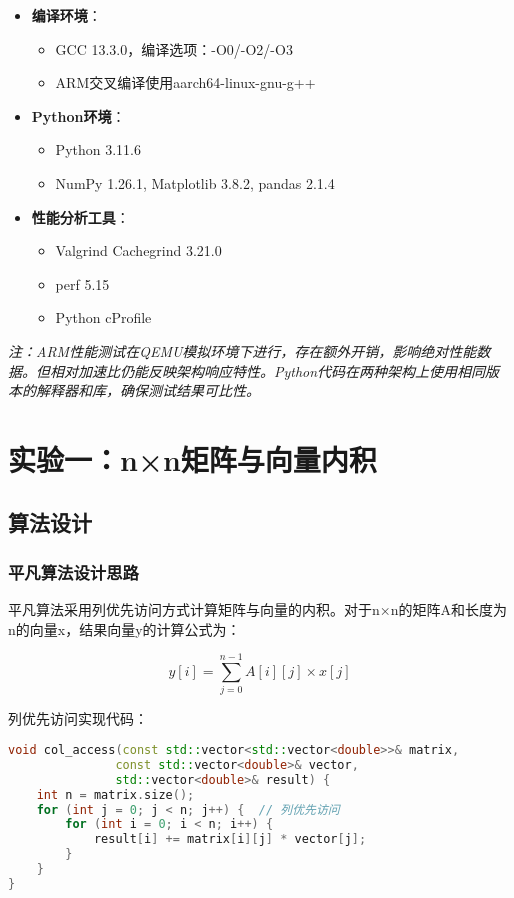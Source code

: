 \documentclass[a4paper,colorlinks=true,linkcolor=blue,urlcolor=blue,citecolor=green,bookmarks=true]{article}
\begin{document}
\begin{itemize}
  \item \textbf{编译环境}：
    \begin{itemize}
      \item GCC 13.3.0，编译选项：-O0/-O2/-O3
      \item ARM交叉编译使用aarch64-linux-gnu-g++
    \end{itemize}
  \item \textbf{Python环境}：
    \begin{itemize}
      \item Python 3.11.6
      \item NumPy 1.26.1, Matplotlib 3.8.2, pandas 2.1.4
    \end{itemize}
  \item \textbf{性能分析工具}：
    \begin{itemize}
      \item Valgrind Cachegrind 3.21.0
      \item perf 5.15
      \item Python cProfile
    \end{itemize}
\end{itemize}

\textit{注：ARM性能测试在QEMU模拟环境下进行，存在额外开销，影响绝对性能数据。但相对加速比仍能反映架构响应特性。Python代码在两种架构上使用相同版本的解释器和库，确保测试结果可比性。}

\section{实验一：n×n矩阵与向量内积}

\subsection{算法设计}

\subsubsection{平凡算法设计思路}

平凡算法采用列优先访问方式计算矩阵与向量的内积。对于n×n的矩阵A和长度为n的向量x，结果向量y的计算公式为：

\begin{equation}
  y[i] = \sum_{j=0}^{n-1} A[i][j] \times x[j]
\end{equation}

列优先访问实现代码：

\begin{lstlisting}[language=C++]
void col_access(const std::vector<std::vector<double>>& matrix, 
               const std::vector<double>& vector,
               std::vector<double>& result) {
    int n = matrix.size();
    for (int j = 0; j < n; j++) {  // 列优先访问
        for (int i = 0; i < n; i++) {
            result[i] += matrix[i][j] * vector[j];
        }
    }
}
\end{lstlisting}
\end{document}
